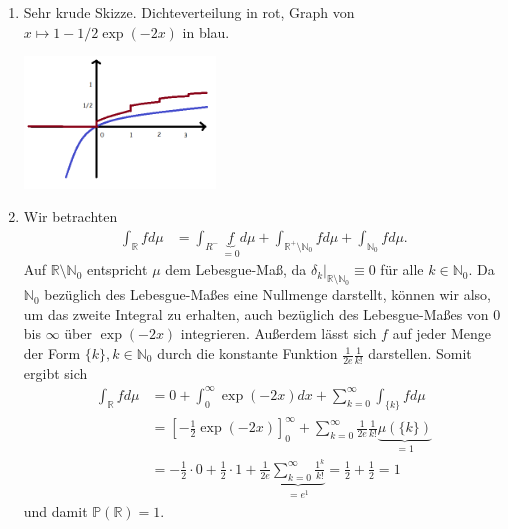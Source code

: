 \documentclass{article}
\def\N{\ensuremath{\mathbb{N}}}
\def\R{\ensuremath{\mathbb{R}}}
\begin{document}
\begin{enumerate}[label=(\alph*)]
	\item Sehr krude Skizze. Dichteverteilung in rot, Graph von $x \mapsto 1 - 1/2 \exp(-2x)$ in blau.
	      \begin{center}
		      \includegraphics[width=0.4\textwidth]{skizze.png}
	      \end{center}
	\item Wir betrachten
	      \begin{align*}
		      \int_{\R} f d\mu & = \int_{R^-} \underbrace{f}_{=0} d\mu + \int_{\R^+ \setminus \N_0} f d\mu + \int_{\N_0} f d\mu\text{.}
	      \end{align*}
	      Auf $\R \setminus \N_0$ entspricht $\mu$ dem Lebesgue-Maß, da $\delta_k|_{\R\setminus \N_0} \equiv 0$ für alle $k \in \N_0$. Da $\N_0$ bezüglich des Lebesgue-Maßes eine Nullmenge darstellt, können wir also, um das zweite Integral zu erhalten, auch bezüglich des Lebesgue-Maßes von $0$ bis $\infty$ über $\exp(-2x)$ integrieren. Außerdem lässt sich $f$ auf jeder Menge der Form $\{k\}, k \in \N_0$ durch die konstante Funktion $\frac{1}{2e} \frac{1}{k!}$ darstellen. Somit ergibt sich
	      \begin{align*}
		      \int_{\R} f d\mu & = 0 + \int_{0}^{\infty} \exp(-2x) dx + \sum_{k=0}^{\infty} \int_{\{k\}} f d\mu                                                                       \\
		                       & = \left[-\frac{1}{2} \exp(-2x)\right]_0^\infty + \sum_{k=0}^{\infty} \frac{1}{2e} \frac{1}{k!} \underbrace{\mu(\{k\})}_{=1}                          \\
		                       & = -\frac{1}{2} \cdot 0 + \frac{1}{2} \cdot 1 + \frac{1}{2e} \underbrace{\sum_{k = 0}^{\infty} \frac{1^k}{k!}}_{=e^1} = \frac{1}{2} + \frac{1}{2} = 1
	      \end{align*}
	      und damit $\mathds{P}(\R) = 1$.
\end{enumerate}
\end{document}
